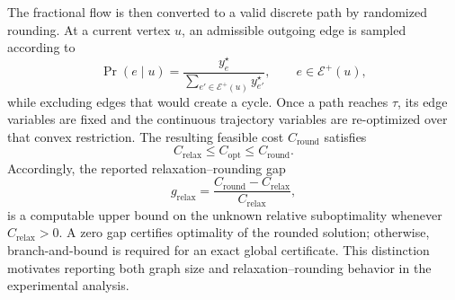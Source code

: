The fractional flow is then converted to a valid discrete path by randomized
rounding. At a current vertex $u$, an admissible outgoing edge is sampled
according to
\begin{equation}
  \Pr(e\mid u)
  =\frac{y_e^\star}
         {\sum_{e'\in\mathcal{E}^{+}(u)}y_{e'}^\star},
  \qquad e\in\mathcal{E}^{+}(u),
  \label{eq:framework-rounding}
\end{equation}
while excluding edges that would create a cycle. Once a path reaches
$\tau$, its edge variables are fixed and the continuous trajectory variables
are re-optimized over that convex restriction.  The resulting feasible cost
$C_{\mathrm{round}}$ satisfies
\begin{equation}
  C_{\mathrm{relax}}\leq C_{\mathrm{opt}}\leq C_{\mathrm{round}}.
  \label{eq:framework-bounds}
\end{equation}
Accordingly, the reported relaxation--rounding gap
\begin{equation}
  g_{\mathrm{relax}}
  =\frac{C_{\mathrm{round}}-C_{\mathrm{relax}}}
         {C_{\mathrm{relax}}},
  \label{eq:framework-relaxation-gap}
\end{equation}
is a computable upper bound on the unknown relative suboptimality whenever
$C_{\mathrm{relax}}>0$. A zero gap certifies optimality of the rounded
solution; otherwise, branch-and-bound is required for an exact global
certificate. This distinction motivates reporting both graph size and
relaxation--rounding behavior in the experimental analysis.
